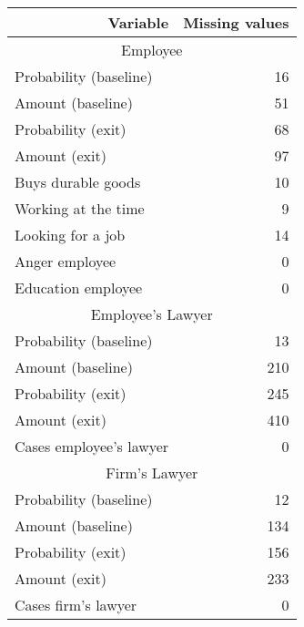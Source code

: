 \begin{tabular}{rr}
\toprule
Variable & Missing values \\
\midrule
\multicolumn{2}{c}{Employee} \\
\multicolumn{1}{l}{Probability (baseline)} & 16 \\
\multicolumn{1}{l}{Amount (baseline)} & 51 \\
\multicolumn{1}{l}{Probability (exit)} & 68 \\
\multicolumn{1}{l}{Amount (exit)} & 97 \\
\multicolumn{1}{l}{Buys durable goods} & 10 \\
\multicolumn{1}{l}{Working at the time} & 9 \\
\multicolumn{1}{l}{Looking for a job} & 14 \\
\multicolumn{1}{l}{Anger employee} & 0 \\
\multicolumn{1}{l}{Education employee} & 0 \\
\multicolumn{2}{c}{Employee's Lawyer} \\
\multicolumn{1}{l}{Probability (baseline)} & 13 \\
\multicolumn{1}{l}{Amount (baseline)} & 210 \\
\multicolumn{1}{l}{Probability (exit)} & 245 \\
\multicolumn{1}{l}{Amount (exit)} & 410 \\
\multicolumn{1}{l}{Cases employee's lawyer} & 0 \\
\multicolumn{2}{c}{Firm's Lawyer} \\
\multicolumn{1}{l}{Probability (baseline)} & 12 \\
\multicolumn{1}{l}{Amount (baseline)} & 134 \\
\multicolumn{1}{l}{Probability (exit)} & 156 \\
\multicolumn{1}{l}{Amount (exit)} & 233 \\
\multicolumn{1}{l}{Cases firm's lawyer} & 0 \\
\bottomrule
\end{tabular}%
